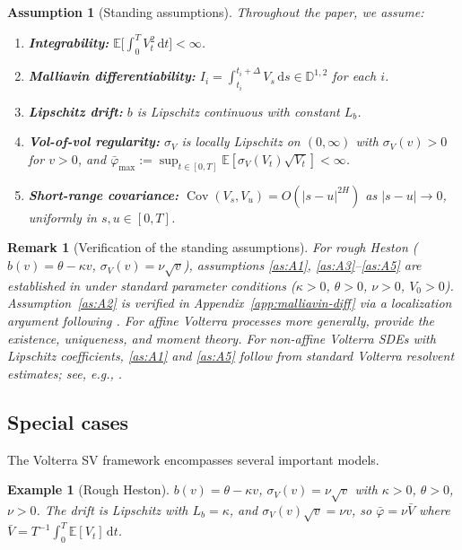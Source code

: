 \documentclass[12pt]{article}
\newtheorem{remark}{Remark}
\newtheorem{example}{Example}
\newtheorem{assumption}{Assumption}
\theoremstyle{definition}
\DeclareMathOperator{\Cov}{Cov}
\newcommand{\E}{\mathbb{E}}
\newcommand{\dd}{\mathrm{d}}
\newcommand{\Dbb}{\mathbb{D}}
\begin{document}
\begin{assumption}[Standing assumptions]\label{as:standing}
Throughout the paper, we assume:
\begin{enumerate}[label=\textnormal{(A\arabic*)}]
\item\label{as:A1}
  \textbf{Integrability:}\;
  $\E\bigl[\int_0^T V_t^2\,\dd t\bigr] < \infty$.
\item\label{as:A2}
  \textbf{Malliavin differentiability:}\;
  $I_i = \int_{t_i}^{t_i+\Delta} V_s\,\dd s \in \Dbb^{1,2}$
  for each $i$.
\item\label{as:A3}
  \textbf{Lipschitz drift:}\;
  $b$ is Lipschitz continuous with constant $L_b$.
\item\label{as:A4}
  \textbf{Vol-of-vol regularity:}\;
  $\sigma_V$ is locally Lipschitz on $(0,\infty)$ with
  $\sigma_V(v) > 0$ for $v > 0$, and
  $\bar\varphi_{\max} :=
  \sup_{t\in[0,T]} \E[\sigma_V(V_t)\sqrt{V_t}] < \infty$.
\item\label{as:A5}
  \textbf{Short-range covariance:}\;
  $\Cov(V_s, V_u) = O(|s{-}u|^{2H})$ as $|s{-}u| \to 0$,
  uniformly in $s, u \in [0,T]$.
\end{enumerate}
\end{assumption}

\begin{remark}[Verification of the standing assumptions]
For \emph{rough Heston}
($b(v) = \theta - \kappa v$, $\sigma_V(v) = \nu\sqrt{v}$),
assumptions \ref{as:A1}, \ref{as:A3}--\ref{as:A5} are established in
\citet{ElEuchRosenbaum2019} under standard parameter conditions
($\kappa > 0$, $\theta > 0$, $\nu > 0$, $V_0 > 0$).
Assumption~\ref{as:A2} is verified in
Appendix~\ref{app:malliavin-diff} via a localization argument
following \citet{AlosLeonVives2007}.
For \emph{affine Volterra processes} more generally,
\citet{AbiJaberLarssonPulido2021} provide the existence, uniqueness,
and moment theory.
For non-affine Volterra SDEs with Lipschitz coefficients,
\ref{as:A1} and \ref{as:A5} follow from standard Volterra resolvent
estimates; see, e.g., \citet{GripenbergLondenStaffans1990}.
\end{remark}

\subsection{Special cases}\label{sec:special-cases}

The Volterra SV framework encompasses several important models.

\begin{example}[Rough Heston]\label{ex:rough-heston}
$b(v) = \theta - \kappa v$, $\sigma_V(v) = \nu\sqrt{v}$ with
$\kappa > 0$, $\theta > 0$, $\nu > 0$.
The drift is Lipschitz with $L_b = \kappa$, and
$\sigma_V(v)\sqrt{v} = \nu v$, so
$\bar\varphi = \nu\bar V$ where
$\bar V = T^{-1}\!\int_0^T\!\E[V_t]\,\dd t$.
\end{example}
\end{document}
